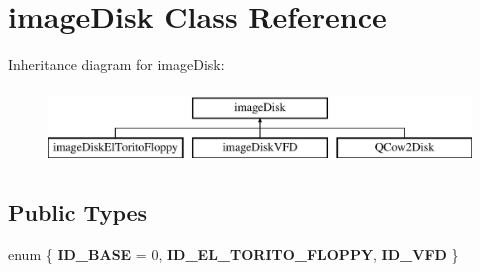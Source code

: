 \hypertarget{classimageDisk}{\section{image\-Disk Class Reference}
\label{classimageDisk}
}
Inheritance diagram for image\-Disk\-:\begin{figure}[H]
\begin{center}
\leavevmode
\includegraphics[height=2.000000cm]{classimageDisk}
\end{center}
\end{figure}
\subsection*{Public Types}
\begin{DoxyCompactItemize}
\item 
enum \{ {\bfseries I\-D\-\_\-\-B\-A\-S\-E} = 0, 
{\bfseries I\-D\-\_\-\-E\-L\-\_\-\-T\-O\-R\-I\-T\-O\-\_\-\-F\-L\-O\-P\-P\-Y}, 
{\bfseries I\-D\-\_\-\-V\-F\-D}
 \}
\end{DoxyCompactItemize}
